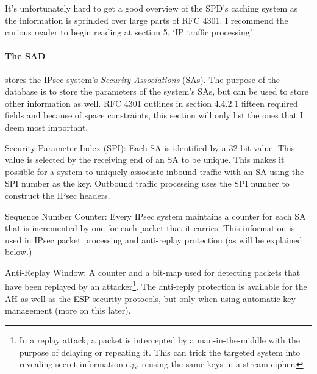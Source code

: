 \documentclass[final,a4paper,twoside,11pt,onecolumn]{report}
\begin{document}
It's unfortunately hard to get a good overview of the SPD's caching system as the information is sprinkled over large parts of RFC 4301. I recommend the curious reader to begin reading at section 5, `IP traffic processing'\citep[Section 5]{rfc4301}.






\paragraph{The SAD} stores the IPsec system's \emph{Security Associations} (SAs). The purpose of the database is to store the parameters of the system's SAs, but can be used to store other information as well. RFC 4301 outlines in section 4.4.2.1 fifteen required fields and because of space constraints, this section will only list the ones that I deem most important.

Security Parameter Index (SPI): Each SA is identified by a 32-bit value. This value is selected by the receiving end of an SA to be unique. This makes it possible for a system to uniquely associate inbound traffic with an SA using the SPI number as the key. Outbound traffic processing uses the SPI number to construct the IPsec headers.

Sequence Number Counter: Every IPsec system maintains a counter for each SA that is incremented by one for each packet that it carries. This information is used in IPsec packet processing and anti-replay protection (as will be explained below.)

Anti-Replay Window: A counter and a bit-map used for detecting packets that have been replayed by an attacker\footnote{In a replay attack, a packet is intercepted by a man-in-the-middle with the purpose of delaying or repeating it. This can trick the targeted system into revealing secret information e.g. reusing the same keys in a stream cipher.}. The anti-reply protection is available for the AH as well as the ESP security protocols, but only when using automatic key management (more on this later).
\end{document}
